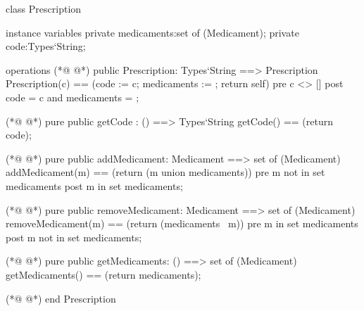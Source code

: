 \begin{vdmpp}[breaklines=true]
class Prescription

instance variables
  private medicaments:set of (Medicament);
  private code:Types`String;
  
operations
(*@
\label{Prescription:8}
@*)
 public Prescription: Types`String ==> Prescription
  Prescription(c) == (code := c; medicaments := {}; return self)
 pre c <> []
 post code = c and medicaments = {};
 
(*@
\label{getCode:13}
@*)
 pure public getCode : () ==> Types`String
  getCode() == (return code);
  
(*@
\label{addMedicament:16}
@*)
 pure public addMedicament: Medicament ==> set of (Medicament)
  addMedicament(m) == (return ({m} union medicaments))
 pre m not in set medicaments
 post m in set medicaments;
  
(*@
\label{removeMedicament:21}
@*)
 pure public removeMedicament: Medicament ==> set of (Medicament)
  removeMedicament(m) == (return (medicaments \ {m}))
 pre m in set medicaments
 post m not in set medicaments;
  
(*@
\label{getMedicaments:26}
@*)
 pure public getMedicaments: () ==> set of (Medicament)
  getMedicaments() == (return medicaments);

(*@
\label{compare:29}
@*)
end Prescription
\end{vdmpp}
